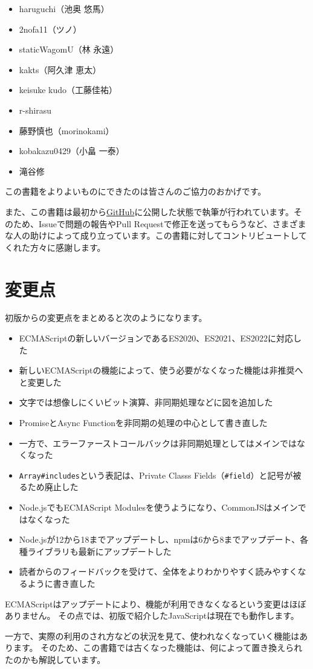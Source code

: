\begin{itemize}
\item haruguchi（池奥 悠馬）
\item 2nofa11（ツノ）
\item staticWagomU（林 永遠）
\item kakts（阿久津 恵太）
\item keisuke kudo（工藤佳祐）
\item r-shirasu
\item 藤野慎也（morinokami）
\item kobakazu0429（小畠 一泰）
\item 滝谷修
\end{itemize}

この書籍をよりよいものにできたのは皆さんのご協力のおかげです。

また、この書籍は最初から\href{https://github.com/asciidwango/js-primer}{GitHub}に公開した状態で執筆が行われています。そのため、Issueで問題の報告やPull Requestで修正を送ってもらうなど、さまざまな人の助けによって成り立っています。この書籍に対してコントリビュートしてくれた方々に感謝します。

\hypertarget{changelog}{%
\section*{変更点}\label{changelog}}

初版からの変更点をまとめると次のようになります。

\begin{itemize}
\item ECMAScriptの新しいバージョンであるES2020、ES2021、ES2022に対応した
\item 新しいECMAScriptの機能によって、使う必要がなくなった機能は非推奨へと変更した
\item 文字では想像しにくいビット演算、非同期処理などに図を追加した
\item PromiseとAsync Functionを非同期の処理の中心として書き直した
\item 一方で、エラーファーストコールバックは非同期処理としてはメインではなくなった
\item \texttt{Array\#includes}という表記は、Private Classs Fields（\texttt{\#field}）と記号が被るため廃止した
\item Node.jsでもECMAScript Modulesを使うようになり、CommonJSはメインではなくなった
\item Node.jsが12から18までアップデートし、npmは6から8までアップデート、各種ライブラリも最新にアップデートした
\item 読者からのフィードバックを受けて、全体をよりわかりやすく読みやすくなるように書き直した
\end{itemize}

ECMAScriptはアップデートにより、機能が利用できなくなるという変更はほぼありません。
その点では、初版で紹介したJavaScriptは現在でも動作します。

一方で、実際の利用のされ方などの状況を見て、使われなくなっていく機能はあります。
そのため、この書籍では古くなった機能は、何によって置き換えられたのかも解説しています。
